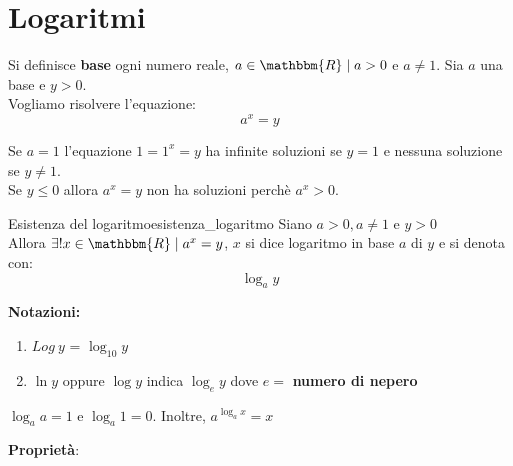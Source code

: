 \documentclass[12pt]{report}
\newcounter{theorem}
\newcommand{\nmu}{}
\begin{document}
	\chapter{Logaritmi}
	Si definisce \textbf{base} ogni numero reale, $a \in \mathbbm{R} \mid a >0$ e $a \neq 1$.
	Sia $a$ una base e $y > 0$. \\
	Vogliamo risolvere l'equazione:
	\[
	a^x = y
	\]
	\begin{note}{}{}
		Se $a = 1$ l'equazione $1= 1^x = y$ ha infinite soluzioni se $y = 1$ e nessuna soluzione se $y \neq 1$. \\
		Se $y \leq 0$ allora $a^x = y$ non ha soluzioni perchè $a^x > 0$.
	\end{note}
	\begin{theorem}{\nmu Esistenza del logaritmo}{esistenza_logaritmo}
		Siano $a > 0, a \neq 1$ e $y > 0$ \\
		Allora $\exists! x \in \mathbbm{R} \mid a^x = y$, $x$ si dice logaritmo in base $a$ di $y$ e si denota con:
		\[
		\log_a{y}
		\]
	\end{theorem}
	\textbf{Notazioni:}
	\begin{enumerate}
		\item $Log \ y$ = $\log_{10}{y}$
		\item $\ln{y}$ oppure $\log{y}$ indica $\log_{e}{y}$ dove $e =$ \textbf{numero di nepero}
	\end{enumerate}
	\begin{note}{}{}
		$\log_a{a} = 1$ e $\log_a{1} = 0$. Inoltre, $a^{\log_a{x}} = x$
	\end{note}
	\textbf{Proprietà}:
\end{document}
